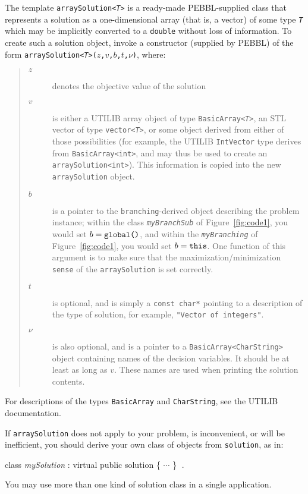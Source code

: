 The template \texttt{arraySolution<\emph{T}>} is a ready-made PEBBL-supplied
class that represents a solution as a one-dimensional array (that is,
a vector) of some type \texttt{\emph{T}} which may be implicitly converted to
a \texttt{double} without loss of information.  To create such a
solution object, invoke a constructor (supplied by PEBBL) of the form
\texttt{arraySolution<\emph{T}>($z$,$v$,$b$,$t$,$\nu$)}, where:
\begin{quote}
\begin{description}
\item[$z$] denotes the objective value of the solution 
\item[$v$] is either a UTILIB array object of type
  \texttt{BasicArray<\emph{T}>}, an STL vector of type 
  \texttt{vector<\emph{T}>}, or
  some object derived from either of those possibilities (for example,
  the UTILIB \texttt{IntVector} type derives from
  \texttt{BasicArray<int>}, and may thus be used to create an
  \texttt{arraySolution<int>}).  This information is copied into the
  new \texttt{arraySolution} object.
\item[$b$] is a pointer
  to the \texttt{branching}-derived object describing the 
  problem instance; within the class \texttt{\emph{myBranchSub}} of
  Figure~\ref{fig:code1}, you would set $b =
  \text{\texttt{global()}}$, and within the
  \texttt{\emph{myBranching}} of Figure~\ref{fig:code1}, you would set
  $b = \text{\texttt{this}}$.  One function of this argument is to
  make sure that the maximization/minimization \texttt{sense} of the
  \texttt{arraySolution} is set correctly.
\item[$t$] is optional, and is simply a \texttt{const char*} pointing to a
  description of the type of solution, for example, \texttt{"Vector
    of integers"}. 
\item[$\nu$] is also optional, and is a pointer to a
  \texttt{BasicArray<CharString>} object containing names of the
  decision variables.  It should be at least as long as $v$.  These
  names are used when printing the solution contents.  
\end{description}
\end{quote}
For descriptions of the types \texttt{BasicArray} and
\texttt{CharString}, see the UTILIB documentation.

If \texttt{arraySolution} does not apply to your problem, is
inconvenient, or will be inefficient, you should derive your own
class of objects from \texttt{solution}, as in:
\begin{codeblock}
class \emph{mySolution} : virtual public solution \{ $\cdots$ \}
$\;.$
\end{codeblock}
You may use more than one kind of solution class in a single
application.  

